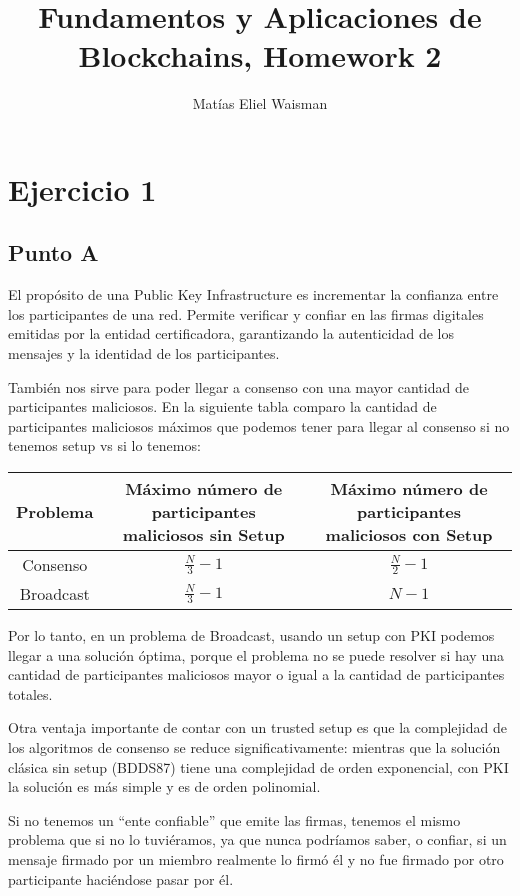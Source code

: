 \documentclass[12pt]{article}
\title{\fontsize{16}{18}\selectfont Fundamentos y Aplicaciones de Blockchains, Homework 2}
\author{Matías Eliel Waisman}
\date{}
\begin{document}
\maketitle

\section*{Ejercicio 1}

\subsection*{Punto A}

El propósito de una Public Key Infrastructure es incrementar la confianza entre los participantes de una red. Permite verificar y confiar en las firmas digitales emitidas por la entidad certificadora, garantizando la autenticidad de los mensajes y la identidad de los participantes.  

También nos sirve para poder llegar a consenso con una mayor cantidad de participantes maliciosos. En la siguiente tabla comparo la cantidad de participantes maliciosos máximos que podemos tener para llegar al consenso si no tenemos setup vs si lo tenemos:

\begin{center}
\begin{tabular}{|c|c|c|}
\hline
Problema & Máximo número de participantes maliciosos sin Setup & Máximo número de participantes maliciosos con Setup \\
\hline
Consenso & $\frac{N}{3} - 1$ & $\frac{N}{2} - 1$ \\
Broadcast & $\frac{N}{3} - 1$ & $N - 1$ \\
\hline
\end{tabular}
\end{center}

Por lo tanto, en un problema de Broadcast, usando un setup con PKI podemos llegar a una solución óptima, porque el problema no se puede resolver si hay una cantidad de participantes maliciosos mayor o igual a la cantidad de participantes totales.  

Otra ventaja importante de contar con un trusted setup es que la complejidad de los algoritmos de consenso se reduce significativamente: mientras que la solución clásica sin setup (BDDS87) tiene una complejidad de orden exponencial, con PKI la solución es más simple y es de orden polinomial.  

Si no tenemos un ``ente confiable'' que emite las firmas, tenemos el mismo problema que si no lo tuviéramos, ya que nunca podríamos saber, o confiar, si un mensaje firmado por un miembro realmente lo firmó él y no fue firmado por otro participante haciéndose pasar por él.  
\end{document}
